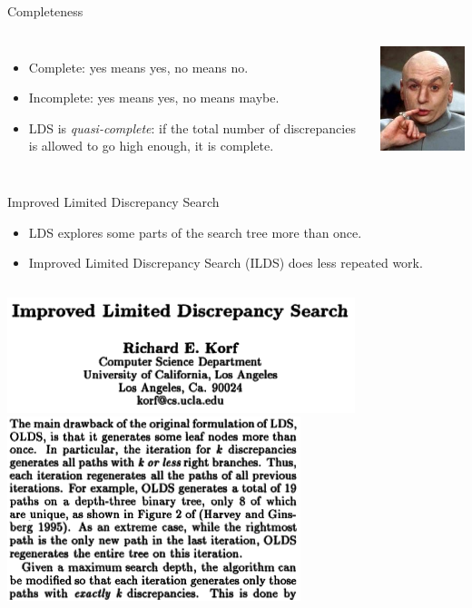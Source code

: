 \documentclass{beamer}
\begin{document}
\begin{frame}{Completeness}
    \begin{columns}
        \begin{itemize}
            \item Complete: yes means yes, no means no.
            \item Incomplete: yes means yes, no means maybe.
            \item LDS is \emph{quasi-complete}: if the total number of discrepancies is allowed to go
                high enough, it is complete.
        \end{itemize}
        \centering\includegraphics*[keepaspectratio=true,scale=0.4]{images/quasi.jpg}
    \end{columns}
\end{frame}

\begin{frame}{Improved Limited Discrepancy Search}
    \begin{itemize}
        \item LDS explores some parts of the search tree more than once.
        \item Improved Limited Discrepancy Search (ILDS) does less repeated work.
    \end{itemize}

    \begin{columns}[T]
        \centering\includegraphics*[keepaspectratio=true,scale=0.4]{images/ilds-paper.png}
        \centering\includegraphics*[keepaspectratio=true,scale=0.4]{images/ilds-claim.png}
    \end{columns}
\end{frame}
\end{document}
